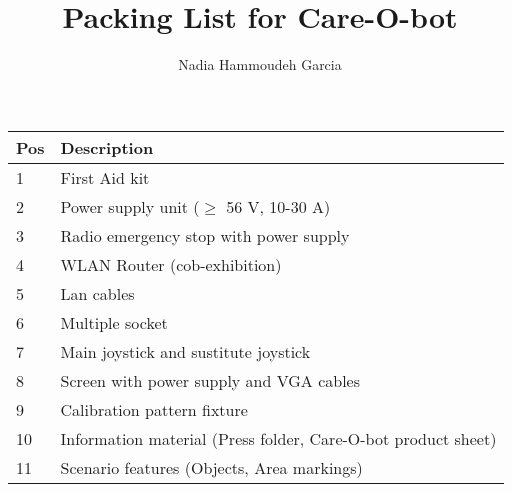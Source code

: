 \documentclass{article}
\title{Packing List for Care-O-bot} %
\author{Nadia Hammoudeh Garcia} %
\begin{document}
\maketitle %

\begin{tabular}{|l|l|}
\hline
\textbf{Pos} & \textbf{Description} \\
\hline\hline
1 & First Aid kit\\
2 & Power supply unit ($\geq$ 56 V, 10-30 A)\\
3 & Radio emergency stop with power supply\\
4 & WLAN Router (cob-exhibition)\\
5 & Lan cables \\
6 & Multiple socket\\
7 & Main joystick and sustitute joystick\\
8 & Screen with power supply and VGA cables\\
9 & Calibration pattern fixture \\
10 & Information material (Press folder, Care-O-bot product sheet) \\
11 & Scenario features (Objects, Area markings) \\

\hline
\end{tabular}
\end{document}
